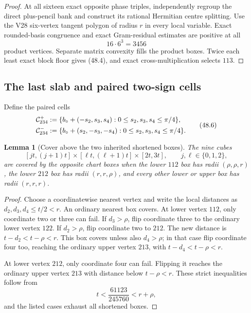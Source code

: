 \documentclass[11pt,oneside]{article}
\newtheorem{lemma}[theorem]{Lemma}
\theoremstyle{definition}
\theoremstyle{remark}
\begin{document}
\begin{proof}
At all sixteen exact opposite phase triples, independently regroup
the direct plus-pencil bank and construct its rational Hermitian
centre splitting.  Use the V28 six-vertex tangent polygon of
radius \(r\) in every local variable.  Exact rounded-basis
congruence and exact Gram-residual estimates are positive at all
\[
 16\cdot6^3=3456                                       \tag{48.5}
\]
product vertices.  Separate matrix convexity fills the product
boxes.  Twice each least exact block floor gives (48.4), and exact
cross-multiplication selects \(113\).
\end{proof}

\subsection{The last slab and paired two-sign cells}

Define the paired cells
\[
\begin{aligned}
 {\cal C}_{234}^{+}
 &:=\{b_\circ+(-s_2,s_3,s_4):
             0\le s_2,s_3,s_4\le\pi/4\},\\
 {\cal C}_{234}^{-}
 &:=\{b_\circ+(s_2,-s_3,-s_4):
             0\le s_2,s_3,s_4\le\pi/4\}.
\end{aligned}                                          \tag{48.6}
\]

\begin{lemma}[Cover above the two inherited shortened boxes]
\label{lem:newv48-special-cover}
The nine cubes
\[
 [jt,(j+1)t]\times[\ell t,(\ell+1)t]\times[2t,3t],
 \qquad j,\ell\in\{0,1,2\},                            \tag{48.7}
\]
are covered by the opposite chart boxes when the lower \(112\)
box has radii \((\rho,\rho,r)\), the lower \(212\) box has radii
\((r,r,\rho)\), and every other lower or upper box has radii
\((r,r,r)\).
\end{lemma}

\begin{proof}
Choose a coordinatewise nearest vertex and write the local
distances as \(d_2,d_3,d_4\le t/2<r\).  An ordinary nearest box
covers.  At lower vertex \(112\), only coordinate two or three can
fail.  If \(d_3>\rho\), flip coordinate three to the ordinary lower
vertex \(122\).  If \(d_2>\rho\), flip coordinate two to \(212\).
The new distance is \(t-d_2<t-\rho<r\).  This box covers unless
also \(d_4>\rho\); in that case flip coordinate four too, reaching
the ordinary upper vertex \(213\), with
\(t-d_4<t-\rho<r\).

At lower vertex \(212\), only coordinate four can fail.  Flipping
it reaches the ordinary upper vertex \(213\) with distance below
\(t-\rho<r\).  These strict inequalities follow from
\[
 t<\frac{61123}{245760}<r+\rho,                        \tag{48.8}
\]
and the listed cases exhaust all shortened boxes.
\end{proof}
\end{document}
